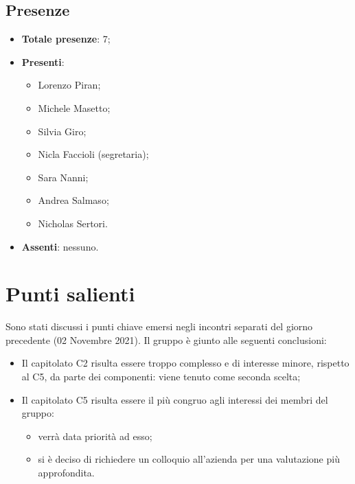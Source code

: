 \documentclass[11pt]{article}
\begin{document}
	\subsection{Presenze}
	\begin{itemize}
		\item \textbf{Totale presenze}: 7;
		\item \textbf{Presenti}:
		\begin{itemize}
			\item Lorenzo Piran;
			\item Michele Masetto;
			\item Silvia Giro;
			\item Nicla Faccioli (segretaria);
			\item Sara Nanni;
			\item Andrea Salmaso;
			\item Nicholas Sertori.		
		\end{itemize}
		\item \textbf{Assenti}: nessuno.
	\end{itemize}

	\newpage

	\section{Punti salienti}
		Sono stati discussi i punti chiave emersi negli incontri separati del giorno precedente (02 Novembre 2021).
		Il gruppo è giunto alle seguenti conclusioni:
		\begin{itemize}
			\item Il capitolato C2 risulta essere troppo complesso e di interesse minore, rispetto al C5,
			da parte dei componenti: viene tenuto come seconda scelta;
			\item Il capitolato C5 risulta essere il più congruo agli interessi dei membri del gruppo:
			\begin{itemize}
				\item verrà data priorità ad esso;
				\item si è deciso di richiedere un colloquio all'azienda per una valutazione più approfondita.
			\end{itemize}
		\end{itemize}
\end{document}
